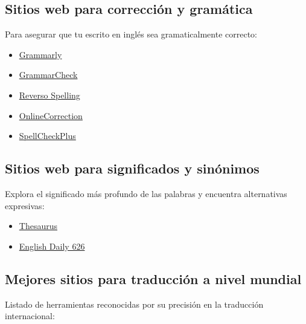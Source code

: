 \documentclass[
  jou,
  floatsintext,
  longtable,
  a4paper,
  nolmodern,
  notxfonts,
  notimes,
  12pt,
  colorlinks=true,linkcolor=blue,citecolor=blue,urlcolor=blue]{apa7}
\providecommand{\tightlist}{%
  \setlength{\itemsep}{0pt}\setlength{\parskip}{0pt}}
\begin{document}
\subsection{Sitios web para corrección y
gramática}\label{sitios-web-para-correcciuxf3n-y-gramuxe1tica}

Para asegurar que tu escrito en inglés sea gramaticalmente correcto:

\begin{itemize}
\tightlist
\item
  \href{https://www.grammarly.com/m}{Grammarly}
\item
  \href{https://www.grammarcheck.net/}{GrammarCheck}
\item
  \href{http://mobile.reverso.net/en}{Reverso Spelling}
\item
  \href{https://www.onlinecorrection.com/}{OnlineCorrection}
\item
  \href{https://spellcheckplus.com/}{SpellCheckPlus}
\end{itemize}

\subsection{Sitios web para significados y
sinónimos}\label{sitios-web-para-significados-y-sinuxf3nimos}

Explora el significado más profundo de las palabras y encuentra
alternativas expresivas:

\begin{itemize}
\tightlist
\item
  \href{https://www.thesaurus.com/}{Thesaurus}
\item
  \href{http://www.englishdaily626.com/}{English Daily 626}
\end{itemize}

\subsection{Mejores sitios para traducción a nivel
mundial}\label{mejores-sitios-para-traducciuxf3n-a-nivel-mundial}

Listado de herramientas reconocidas por su precisión en la traducción
internacional:
\end{document}
